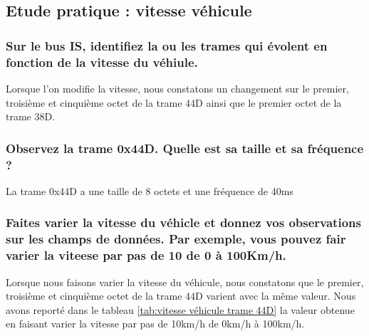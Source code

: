 \documentclass{rapportECC}
\begin{document}

\subsection{Etude pratique : vitesse véhicule}

\subsubsection*{Sur le bus IS, identifiez la ou les trames qui évolent en fonction de la vitesse du véhiule.}

Lorsque l'on modifie la vitesse, nous constatons un changement sur le premier, troisième et cinquième octet de la trame 44D ainsi que le premier octet de la trame 38D.

\subsubsection*{Observez la trame 0x44D. Quelle est sa taille et sa fréquence ?}

La trame 0x44D a une taille de 8 octets et une fréquence de 40ms

\subsubsection*{Faites varier la vitesse du véhicle et donnez vos observations sur les champs de données. Par exemple, vous pouvez fair varier la viteese par pas de 10 de 0 à 100Km/h.}

Lorsque nous faisons varier la vitesse du véhicule, nous constatons que le premier, troisième et cinquième octet de la trame 44D varient avec la même valeur. Nous avons reporté dans le tableau \ref{tab:vitesse véhicule trame 44D} la valeur obtenue en faisant varier la vitesse par pas de 10km/h de 0km/h à 100km/h.
\end{document}
